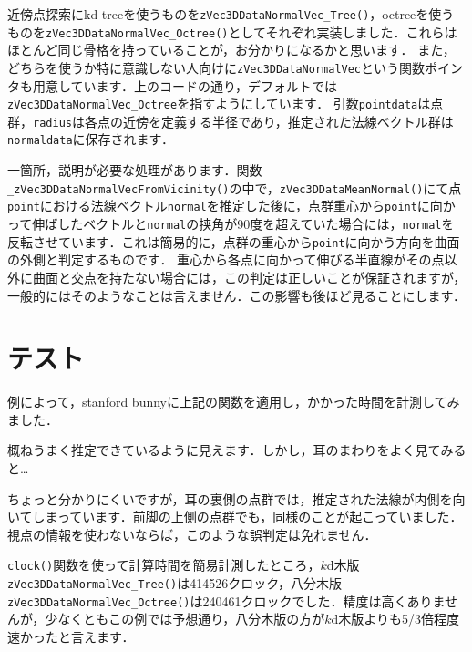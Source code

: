 ﻿\documentclass[a4paper]{jsarticle}
\begin{document}
近傍点探索にkd-treeを使うものを\verb|zVec3DDataNormalVec_Tree()|，octreeを使うものを\verb|zVec3DDataNormalVec_Octree()|としてそれぞれ実装しました．これらはほとんど同じ骨格を持っていることが，お分かりになるかと思います．
また，どちらを使うか特に意識しない人向けに\verb|zVec3DDataNormalVec|という関数ポインタも用意しています．上のコードの通り，デフォルトでは\verb|zVec3DDataNormalVec_Octree|を指すようにしています．
引数\verb|pointdata|は点群，\verb|radius|は各点の近傍を定義する半径であり，推定された法線ベクトル群は\verb|normaldata|に保存されます．

一箇所，説明が必要な処理があります．関数\verb|_zVec3DDataNormalVecFromVicinity()|の中で，\verb|zVec3DDataMeanNormal()|にて点\verb|point|における法線ベクトル\verb|normal|を推定した後に，点群重心から\verb|point|に向かって伸ばしたベクトルと\verb|normal|の挟角が90度を超えていた場合には，\verb|normal|を反転させています．これは簡易的に，点群の重心から\verb|point|に向かう方向を曲面の外側と判定するものです．
重心から各点に向かって伸びる半直線がその点以外に曲面と交点を持たない場合には，この判定は正しいことが保証されますが，一般的にはそのようなことは言えません．この影響も後ほど見ることにします．


\section{テスト}

例によって，stanford bunnyに上記の関数を適用し，かかった時間を計測してみました．


概ねうまく推定できているように見えます．しかし，耳のまわりをよく見てみると…


ちょっと分かりにくいですが，耳の裏側の点群では，推定された法線が内側を向いてしまっています．前脚の上側の点群でも，同様のことが起こっていました．視点の情報を使わないならば，このような誤判定は免れません．


\verb|clock()|関数を使って計算時間を簡易計測したところ，$k$d木版\verb|zVec3DDataNormalVec_Tree()|は414526クロック，八分木版\verb|zVec3DDataNormalVec_Octree()|は240461クロックでした．精度は高くありませんが，少なくともこの例では予想通り，八分木版の方が$k$d木版よりも5/3倍程度速かったと言えます．
\end{document}
